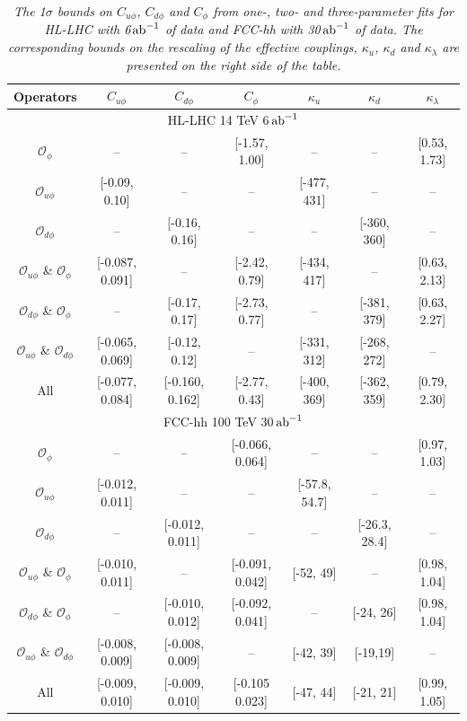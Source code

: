 \begin{table}[]
	\centering
	{\footnotesize
		\begin{tabular}{cccc||ccc}
			\toprule
			Operators &  $C_{u\phi}$&   $C_{d\phi}$&   $C_{\phi}$&    $\kappa_{u}$&   $\kappa_{d}$&   $\kappa_\lambda$\\
			\midrule
			\multicolumn{7}{c}{HL-LHC 14 TeV 6$\,{\rm ab}^{-1}$}\\
			\midrule
			$\mathcal O_{\phi}$ &--   & --            &[-1.57, 1.00] &--  & -- &[0.53, 1.73]\\
			$\mathcal O_{u\phi}$&[-0.09, 0.10]   & --            &-- &[-477, 431]  & -- &--\\
			$\mathcal O_{d\phi}$&--   & [-0.16, 0.16]            &-- &--  & [-360, 360] &--\\
			$\mathcal O_{u\phi}$ \& $\mathcal O_{\phi}$ &[-0.087, 0.091]  & --            &[-2.42, 0.79] &[-434, 417] & -- &[0.63, 2.13]\\
			$\mathcal O_{d\phi}$ \& $\mathcal O_{\phi}$ & --             &[-0.17, 0.17]  &[-2.73, 0.77]& -- &[-381, 379] &[0.63, 2.27]\\
			$\mathcal O_{u\phi}$ \& $\mathcal O_{d\phi}$&[-0.065, 0.069]&[-0.12, 0.12]& --            &[-331, 312] &[-268, 272] & -- \\
			All                                   &[-0.077, 0.084]&[-0.160, 0.162]& [-2.77, 0.43]&[-400, 369] &[-362, 359] & [0.79, 2.30] \\
			\midrule
			\midrule
			\multicolumn{7}{c}{FCC-hh 100 TeV 30$\,{\rm ab}^{-1}$}\\
			\midrule
			$\mathcal O_{\phi}$ &--   & --            &[-0.066, 0.064] &--  & -- &[0.97, 1.03]\\
			$\mathcal O_{u\phi}$&[-0.012, 0.011]   & --            &-- &[-57.8, 54.7]  & -- &--\\
			$\mathcal O_{d\phi}$&--   & [-0.012, 0.011]            &-- &--  & [-26.3, 28.4] &--\\
			$\mathcal O_{u\phi}$ \& $\mathcal O_{\phi}$ &[-0.010, 0.011]  & --            &[-0.091, 0.042] &[-52, 49] & -- &[0.98, 1.04]\\
			$\mathcal O_{d\phi}$ \& $\mathcal O_{\phi}$ & --             &[-0.010, 0.012]  &[-0.092, 0.041]& -- &[-24, 26] &[0.98, 1.04]\\
			$\mathcal O_{u\phi}$ \& $\mathcal O_{d\phi}$&[-0.008, 0.009]&[-0.008, 0.009]& --            &[-42, 39] &[-19,19] & -- \\
			All                                   &[-0.009, 0.010]&[-0.009, 0.010]& [-0.105 0.023]&[-47, 44] &[-21, 21] & [0.99, 1.05] \\
			\bottomrule
		\end{tabular}
	}
	\caption{\it The 1$\sigma$ bounds on $C_{u\phi}$, $C_{d\phi}$ and $C_\phi$ from one-, two- and three-parameter fits for HL-LHC with 6$\,{\rm ab}^{-1}$ of data and FCC-hh with 30$\,{\rm ab}^{-1}$ of data. The corresponding bounds on the rescaling of the effective couplings, $\kappa_u$, $\kappa_d$ and $\kappa_\lambda$ are presented on the right side of the table.}
	\label{tab:twoparambounds}
\end{table}

